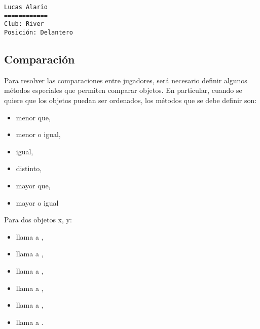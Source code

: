 \documentclass[a4paper,12pt,spanish]{sphinxmanual}
\begin{document}
\begin{Verbatim}[commandchars=\\\{\}]
Lucas Alario
============
Club: River
Posición: Delantero
\end{Verbatim}


\subsection{Comparación}
\label{Unidad05:comparacion}
Para resolver las comparaciones entre jugadores, será necesario definir
algunos métodos especiales que permiten comparar objetos. En particular,
cuando se quiere que los objetos puedan ser ordenados, los métodos que
se debe definir son:
\begin{itemize}
\item {} 
 menor que,

\item {} 
 menor o igual,

\item {} 
 igual,

\item {} 
 distinto,

\item {} 
 mayor que,

\item {} 
 mayor o igual

\end{itemize}

Para dos objetos x, y:
\begin{itemize}
\item {} 
 llama a ,

\item {} 
 llama a ,

\item {} 
 llama a ,

\item {} 
 llama a ,

\item {} 
 llama a ,

\item {} 
 llama a .

\end{itemize}
\end{document}
